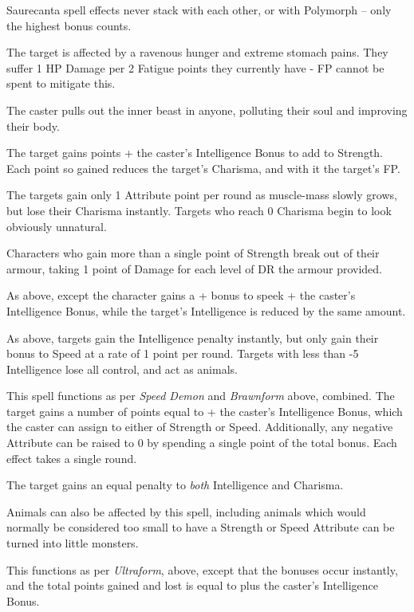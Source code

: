 	Saurecanta spell effects never stack with each other, or with Polymorph -- only the highest bonus counts.

\spelllevel \label{saurecantaone}
The target is affected by a ravenous hunger and extreme stomach pains.  They suffer 1 HP Damage per 2 Fatigue points they currently have - FP cannot be spent to mitigate this.

\spelllevel
{}
The caster pulls out the inner beast in anyone, polluting their soul and improving their body.

The target gains  points + the caster's Intelligence Bonus to add to Strength.  Each point so gained reduces the target's Charisma, and with it the target's FP.

The targets gain only 1 Attribute point per round as muscle-mass slowly grows, but lose their Charisma instantly.  Targets who reach 0 Charisma begin to look obviously unnatural.

Characters who gain more than a single point of Strength break out of their armour, taking 1 point of Damage for each level of DR the armour provided.

As above, except the character gains a + bonus to speek + the caster's Intelligence Bonus, while the target's Intelligence is reduced by the same amount.

As above, targets gain the Intelligence penalty instantly, but only gain their bonus to Speed at a rate of 1 point per round.  Targets with less than -5 Intelligence lose all control, and act as animals.

\spelllevel
{}
This spell functions as per {\it Speed Demon} and {\it Brawnform} above, combined.  The target gains a number of points equal to  + the caster's Intelligence Bonus, which the caster can assign to either of Strength or Speed.  Additionally, any negative Attribute can be raised to 0 by spending a single point of the total bonus.  Each effect takes a single round.

The target gains an equal penalty to {\it both} Intelligence and Charisma.

Animals can also be affected by this spell, including animals which would normally be considered too small to have a Strength or Speed Attribute can be turned into little monsters.

\spelllevel
{}
This functions as per {\it Ultraform}, above, except that the bonuses occur instantly, and the total points gained and lost is equal to  plus the caster's Intelligence Bonus.

